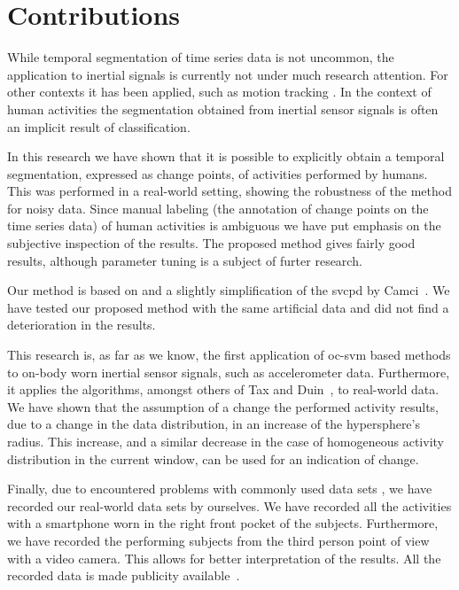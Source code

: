 \section{Contributions}\label{sec:main_findings}
While temporal segmentation of time series data is not uncommon, the application to inertial signals is currently not under much research attention.
For other contexts it has been applied, such as motion tracking \cite{barbivc2004segmenting,li2007segmentation}.
In the context of human activities the segmentation obtained from inertial sensor signals is often an implicit result of classification.

In this research we have shown that it is possible to explicitly obtain a temporal segmentation, expressed as change points, of activities performed by humans.
This was performed in a real-world setting, showing the robustness of the method for noisy data.
Since manual labeling (the annotation of change points on the time series data) of human activities is ambiguous we have put emphasis on the subjective inspection of the results.
The proposed method gives fairly good results, although parameter tuning is a subject of furter research.

Our method is based on and a slightly simplification of the \gls{svcpd} by Camci~\cite{camci2010change}.
We have tested our proposed method with the same artificial data and did not find a deterioration in the results.

This research is, as far as we know, the first application of \gls{oc-svm} based methods to on-body worn inertial sensor signals, such as accelerometer data.
Furthermore, it applies the algorithms, amongst others of Tax and Duin~\cite{tax1999support}, to real-world data.
We have shown that the assumption of a change the performed activity results, due to a change in the data distribution, in an increase of the hypersphere's radius.
This increase, and a similar decrease in the case of homogeneous activity distribution in the current window, can be used for an indication of change.

Finally, due to encountered problems with commonly used data sets \cite{kwapisz2011activity,anguita2012human}, we have recorded our real-world data sets by ourselves.
We have recorded all the activities with a smartphone worn in the right front pocket of the subjects.
Furthermore, we have recorded the performing subjects from the third person point of view with a video camera.
This allows for better interpretation of the results.
All the recorded data is made publicity available~\cite{vlasveld2013continuous}.

